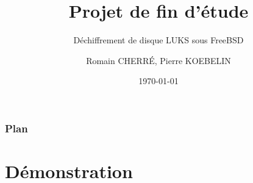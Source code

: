 \documentclass{beamer}
\title[Short title]{Projet de fin d'étude} %
\subtitle{Déchiffrement de disque LUKS sous FreeBSD}
\author{Romain CHERRÉ, Pierre KOEBELIN} %
\date{\today} %
\begin{document}
\begin{frame}
  \titlepage %
\end{frame}

\begin{frame}
  \frametitle{Plan} %
  \tableofcontents %
\end{frame}












\section{Démonstration}


\end{document}
